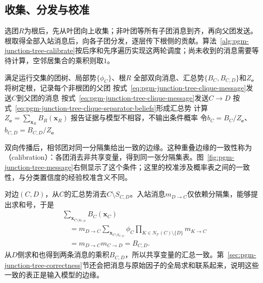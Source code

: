 \subsection{收集、分发与校准}
\label{sec:pgm-junction-tree-calibration}

选团$R$为根后，先从叶团向上收集；非叶团等所有子团消息到齐，再向父团发送。根取得全部入站消息后，向各子团分发，逐层传下根侧的贡献。算法~\ref{alg:pgm-junction-tree-calibrate}按后序和先序遍历实现这两轮调度；尚未收到的消息需要等待计算，空邻居集合的乘积则取$1$。

\begin{algorithm}[团树上的和积校准]
  \label{alg:pgm-junction-tree-calibrate}
  \begin{algorithmic}[1]
    \Require 满足运行交集的团树、局部势$\{\phi_C\}$、根$R$
    \Ensure 全部双向消息、汇总势$\{B_C,B_{C,D}\}$和$Z_{\bm{e}}$
    \State 将树定根，记录每个非根团的父团
      \State 按式~\eqref{eq:pgm-junction-tree-clique-message}发送$C$到父团的消息
    \EndFor
        \State 按式~\eqref{eq:pgm-junction-tree-clique-message}发送$C\to D$
      \EndFor
    \EndFor
    \State 按式~\eqref{eq:pgm-junction-tree-clique-separator-beliefs}形成汇总势
    \State 计算$Z_{\bm{e}}=\sum_{\bm{x}_R}B_R(\bm{x}_R)$
      \State 报告证据与模型不相容，不输出条件概率
    \Else
      \State 令$b_C=B_C/Z_{\bm{e}}$、$b_{C,D}=B_{C,D}/Z_{\bm{e}}$
    \EndIf
  \end{algorithmic}
\end{algorithm}

双向传播后，相邻团对同一分隔集给出一致的边缘。这种重叠边缘的一致性称为（calibration）：各团消去非共享变量，得到同一张分隔集表。图~\ref{fig:pgm-junction-tree-message}右侧显示了这个条件；这里的校准涉及概率表之间的一致性，与分类置信度的经验校准含义不同。

对边$(C,D)$，从$C$的汇总势消去$C\setminus S_{C,D}$。入站消息$m_{D\to C}$仅依赖分隔集，能够提出求和号，于是
\begin{equation}
  \begin{aligned}
    &\sum_{\bm{x}_{C\setminus S_{C,D}}}B_C(\bm{x}_C)\\
      &\quad=m_{D\to C}
        \sum_{\bm{x}_{C\setminus S_{C,D}}}
          \phi_C\prod_{K\in N_{\mathcal{T}}(C)\setminus\{D\}}m_{K\to C}\\
      &\quad=m_{D\to C}m_{C\to D}=B_{C,D}.
  \end{aligned}
  \label{eq:pgm-junction-tree-local-calibration}
\end{equation}
从$D$侧求和也得到两条消息的乘积$B_{C,D}$，所以共享变量的汇总一致。第~\ref{sec:pgm-junction-tree-correctness}节还会把消息与原始因子的全局求和联系起来，说明这些一致的表正是输入模型的边缘。

